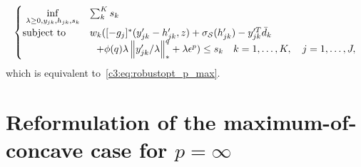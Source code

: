 {\begin{equation*}
	\begin{aligned}
\begin{cases}
	~\underset{\lambda \geq 0, y_{jk},h_{jk}, s_k}{\inf} & \sum_k^K s_k\\
	\mbox{subject to} & w_k ([-g_j]^*(y_{jk}' - h_{jk}',z) + \sigma_{\mathcal{S}}(h_{jk}') - y_{jk}'^T\bar{d}_k \\
	&~~ + \phi(q)\lambda \left\|y_{jk}'/\lambda \right\|^q_* + \lambda \epsilon^p ) \le s_k \quad k = 1,\dots,K, \quad j = 1,\dots,J,
\end{cases}
\end{aligned}
\end{equation*}
which is equivalent to~\eqref{c3:eq:robustopt_p_max}.
}

\section{Reformulation of the maximum-of-concave case for ${p = \infty}$}
\label{app:dual_form-p_max}

